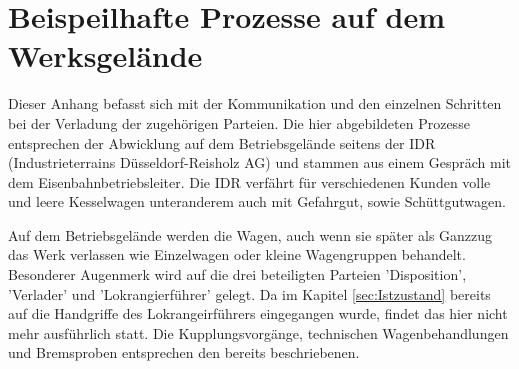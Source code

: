 \section{Beispeilhafte Prozesse auf dem Werksgelände}\label{sec:realeIst}
Dieser Anhang befasst sich mit der Kommunikation und den einzelnen Schritten bei der Verladung der zugehörigen Parteien. Die hier abgebildeten Prozesse entsprechen der Abwicklung auf dem Betriebsgelände seitens der IDR (Industrieterrains Düsseldorf-Reisholz AG) und stammen aus einem Gespräch mit dem Eisenbahnbetriebsleiter.\cite{IDR} Die IDR verfährt für verschiedenen Kunden volle und leere Kesselwagen unteranderem auch mit Gefahrgut, sowie Schüttgutwagen. \par
Auf dem Betriebsgelände werden die Wagen, auch wenn sie später als Ganzzug das Werk verlassen wie Einzelwagen oder kleine Wagengruppen behandelt. Besonderer Augenmerk wird auf die drei beteiligten Parteien 'Disposition', 'Verlader' und 'Lokrangierführer' gelegt. Da im Kapitel \ref{sec:Istzustand} bereits auf die Handgriffe des Lokrangeirführers eingegangen wurde, findet das hier nicht mehr ausführlich statt. Die Kupplungsvorgänge, technischen Wagenbehandlungen und Bremsproben entsprechen den bereits beschriebenen.

